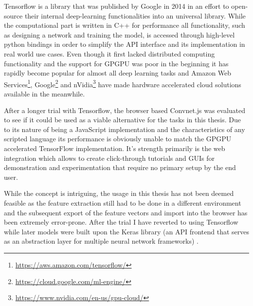 
Tensorflow \cite{tensorflow2015-whitepaper} is a library that was published by Google in 2014 in an effort to open-source their internal deep-learning functionalities into an universal library. While the computational part is written in C++ for performance all functionality, such as designing a network and training the model, is accessed through high-level python bindings in order to simplify the API interface and its implementation in real world use cases. Even though it first lacked distributed computing functionality and the support for GPGPU was poor in the beginning it has rapidly become popular for almost all deep learning tasks and Amazon Web Services\footnote{\url{https://aws.amazon.com/tensorflow/}}, Google\footnote{\url{https://cloud.google.com/ml-engine/}} and nVidia\footnote{\url{https://www.nvidia.com/en-us/gpu-cloud/}} have made hardware accelerated cloud solutions available in the meanwhile.

After a longer trial with Tensorflow, the browser based Convnet.js was evaluated to see if it could be used as a viable alternative for the tasks in this thesis.
Due to its nature of being a JavaScript implementation and the characteristics of any scripted language its performance is obviously unable to match the GPGPU accelerated TensorFlow implementation. It's strength primarily is the web integration which allows to create click-through tutorials and GUIs for demonstration and experimentation that require no primary setup by the end user. 

While the concept is intriguing, the usage in this thesis has not been deemed feasible as the feature extraction still had to be done in a different environment and the subsequent export of the feature vectors and import into the browser has been extremely error-prone. After the trial I have reverted to using Tensorflow while later models were built upon the Keras library (an API frontend that serves as an abstraction layer for multiple neural network frameworks) \cite{chollet2015keras}.



\newpage




